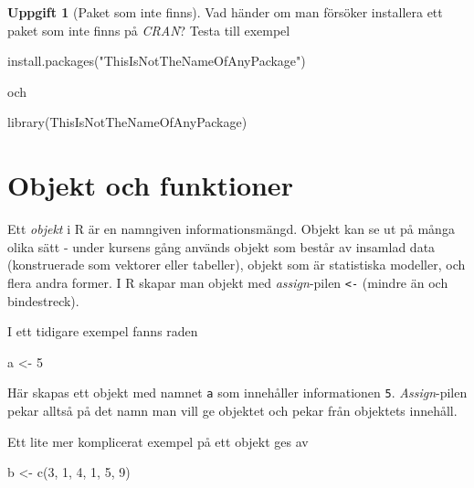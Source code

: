 \documentclass[
]{book}
\newenvironment{Shaded}{\begin{snugshade}}{\end{snugshade}}
\newcommand{\DecValTok}[1]{\textcolor[rgb]{0.00,0.00,0.81}{#1}}
\newcommand{\FunctionTok}[1]{\textcolor[rgb]{0.00,0.00,0.00}{#1}}
\newcommand{\NormalTok}[1]{#1}
\newcommand{\OtherTok}[1]{\textcolor[rgb]{0.56,0.35,0.01}{#1}}
\newcommand{\StringTok}[1]{\textcolor[rgb]{0.31,0.60,0.02}{#1}}
\theoremstyle{definition}
\theoremstyle{definition}
\theoremstyle{definition}
\newtheorem{exercise}{Uppgift}[chapter]
\theoremstyle{definition}
\theoremstyle{remark}
\begin{document}
\begin{exercise}[Paket som inte finns]

Vad händer om man försöker installera ett paket som inte finns på \emph{CRAN}? Testa till exempel

\begin{Shaded}
\begin{Highlighting}[]
\FunctionTok{install.packages}\NormalTok{(}\StringTok{"ThisIsNotTheNameOfAnyPackage"}\NormalTok{)}
\end{Highlighting}
\end{Shaded}

och

\begin{Shaded}
\begin{Highlighting}[]
\FunctionTok{library}\NormalTok{(ThisIsNotTheNameOfAnyPackage)}
\end{Highlighting}
\end{Shaded}

\end{exercise}

\hypertarget{objekt-och-funktioner}{%
\section{Objekt och funktioner}\label{objekt-och-funktioner}}

Ett \emph{objekt} i R är en namngiven informationsmängd. Objekt kan se ut på många olika sätt - under kursens gång används objekt som består av insamlad data (konstruerade som vektorer eller tabeller), objekt som är statistiska modeller, och flera andra former. I R skapar man objekt med \emph{assign}-pilen \texttt{\textless{}-} (mindre än och bindestreck).

I ett tidigare exempel fanns raden

\begin{Shaded}
\begin{Highlighting}[]
\NormalTok{a }\OtherTok{\textless{}{-}} \DecValTok{5}
\end{Highlighting}
\end{Shaded}

Här skapas ett objekt med namnet \texttt{a} som innehåller informationen \texttt{5}. \emph{Assign}-pilen pekar alltså på det namn man vill ge objektet och pekar från objektets innehåll.

Ett lite mer komplicerat exempel på ett objekt ges av

\begin{Shaded}
\begin{Highlighting}[]
\NormalTok{b }\OtherTok{\textless{}{-}} \FunctionTok{c}\NormalTok{(}\DecValTok{3}\NormalTok{, }\DecValTok{1}\NormalTok{, }\DecValTok{4}\NormalTok{, }\DecValTok{1}\NormalTok{, }\DecValTok{5}\NormalTok{, }\DecValTok{9}\NormalTok{)}
\end{Highlighting}
\end{Shaded}
\end{document}
